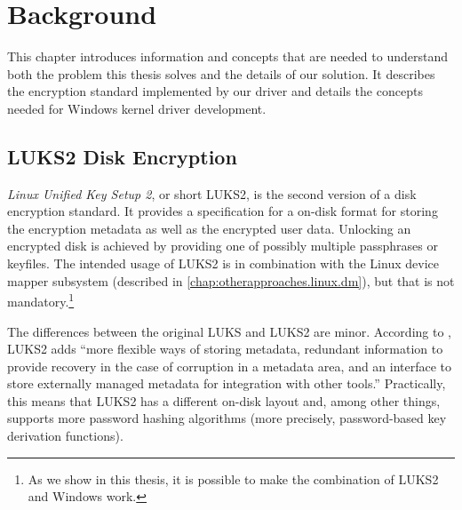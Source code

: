 \chapter{Background}
\label{chap:background}
This chapter introduces information and concepts that are needed to understand both the problem this thesis solves and the details of our solution. It describes the encryption standard implemented by our driver and details the concepts needed for Windows kernel driver development.

\section{LUKS2 Disk Encryption}
\label{chap:background.luks2}
\emph{Linux Unified Key Setup 2}, or short LUKS2, is the second version of a disk encryption standard. It provides a specification \cite{Broz2018} for a on-disk format for storing the encryption metadata as well as the encrypted user data. Unlocking an encrypted disk is achieved by providing one of possibly multiple passphrases or keyfiles. The intended usage of LUKS2 is in combination with the Linux device mapper subsystem (described in \autoref{chap:otherapproaches.linux.dm}), but that is not mandatory.\footnote{\label{fn:luks2windows} As we show in this thesis, it is possible to make the combination of LUKS2 and Windows work.}

The differences between the original LUKS and LUKS2 are minor. According to \cite{Broz2018}, LUKS2 adds ``more flexible ways of storing metadata, redundant information to provide recovery in the case of corruption in a metadata area, and an interface to store externally managed metadata for integration with other tools.'' Practically, this means that LUKS2 has a different on-disk layout and, among other things, supports more password hashing algorithms (more precisely, password-based key derivation functions).

